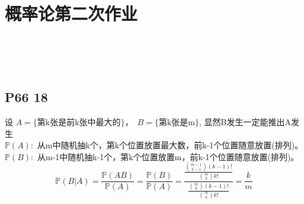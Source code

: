 \documentclass[10pt,a4paper]{article}
\begin{document}

{\centering\section*{概率论第二次作业}}
%
\begin{flushright}
	\Large {} \\
	\Large {} \\
	\Large {} \\
\end{flushright}


\subsection{P66 18}
设 $ A=\{ \mbox{第k张是前k张中最大的} \} $，\ $ B=\{ \mbox{第k张是m} \} $, 显然B发生一定能推出A发生 \\
$ \mathbb{P}(A): $ 从m中随机抽k个，第k个位置放置最大数，前k-1个位置随意放置(排列)。$ \mathbb{P}(B): $ 从m-1中随机抽k-1个，第k个位置放置m，前k-1个位置随意放置(排列)。
$$ \mathbb{P}(B|A)=\frac{\mathbb{P}(AB)}{\mathbb{P}(A)}=\frac{\mathbb{P}(B)}{\mathbb{P}(A)}=\frac{\frac{{m-1 \choose k-1} (k-1)!}{{m \choose k} k!}}{\frac{{m \choose k} (k-1)!}{{m \choose k} k!}}=\frac{k}{m} 
$$ 
\end{document}
